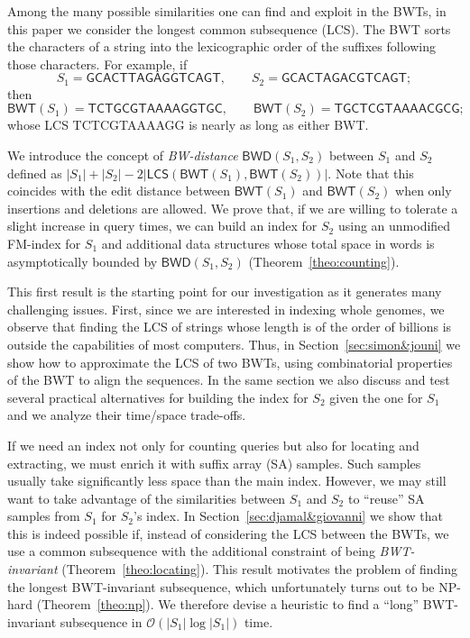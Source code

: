 \documentclass{llncs}
\newcommand{\Oh}[1]
  {\ensuremath{\mathcal{O}\!\left( {#1} \right)}}
\newcommand{\LCS}
  {\ensuremath{\mathsf{LCS}}}
\newcommand{\BWD}
  {\ensuremath{\mathsf{BWD}}}
\newcommand{\BWT}
  {\ensuremath{\mathsf{BWT}}}
\begin{document}
Among the many possible similarities one can find and exploit in the BWTs, in
this paper we consider the longest common subsequence (LCS). The BWT sorts
the characters of a string into the lexicographic order of the suffixes
following those characters.  For example, if
$$
S_1 = \mathsf{GCACTTAGAGGTCAGT},\qquad
S_2 = \mathsf{GCACTAGACGTCAGT};
$$
then
$$
\BWT (S_1) = \mathsf{TCTGCGTAAAAGGTGC},\qquad
\BWT (S_2) = \mathsf{TGCTCGTAAAACGCG};
$$
whose LCS {\sf TCTCGTAAAAGG} is nearly as long as either BWT.

We introduce the concept of {\em BW-distance} \(\BWD (S_1, S_2)\) between
$S_1$ and $S_2$ defined as $|S_1| + |S_2| - 2 |\LCS(\BWT (S_1),\BWT (S_2))|$.
Note that this coincides with the edit distance between $\BWT (S_1)$ and
$\BWT (S_2)$ when only insertions and deletions are allowed. We prove that,
if we are willing to tolerate a slight increase in query times, we can build
an index for $S_2$ using an unmodified FM-index for $S_1$ and additional data
structures whose total space in words is asymptotically bounded by $\BWD
(S_1, S_2)$ (Theorem~\ref{theo:counting}).

This first result is the starting point for our investigation as it generates
many challenging issues. First, since we are interested in indexing whole
genomes, we observe that finding the LCS of strings
whose length is of the order of billions is outside the capabilities of most
computers. Thus, in Section~\ref{sec:simon&jouni} we show how to approximate
the LCS of two BWTs, using combinatorial properties of
the BWT to align the sequences. In the same section we also discuss and test
several practical alternatives for building the index for $S_2$ given the one
for $S_1$ and we analyze their time/space trade-offs.

If we need an index not only for counting queries but also for locating and
extracting, we must enrich it with suffix array (SA) samples. Such samples
usually take significantly less space than the main index. However, we may
still want to take advantage of the similarities between $S_1$ and $S_2$ to
``reuse'' SA samples from $S_1$ for $S_2$'s index. In
Section~\ref{sec:djamal&giovanni} we show that this is indeed possible if,
instead of considering the LCS between the BWTs, we use a common subsequence
with the additional constraint of being {\em BWT-invariant}
(Theorem~\ref{theo:locating}). This result motivates the problem of finding
the longest BWT-invariant subsequence, which unfortunately turns out to be
NP-hard (Theorem~\ref{theo:np}). We therefore devise a heuristic to find a
``long'' BWT-invariant subsequence in $\Oh{|S_1|\log|S_1|}$ time.
\end{document}
